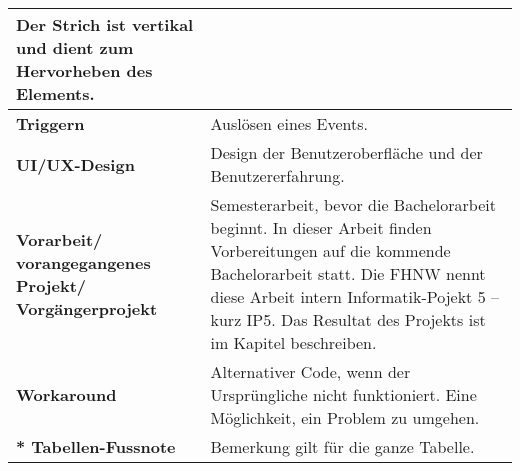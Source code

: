 \begin{table}[!ht]
\begin{adjustbox}{max width=\textwidth}
\begin{tabular}{ p{\glossarywithTitle} | p{\glossarywith} }
                Der Strich ist vertikal und dient zum Hervorheben des Elements. \\
            \hline
            \bf{Triggern} & Auslösen eines Events. \\
            \hline
            \bf{UI/UX-Design} & Design der Benutzeroberfläche und der Benutzererfahrung. \\
            \hline
            \raggedright \bf{Vorarbeit/ vorangegangenes Projekt/ Vorgängerprojekt} & 
                Semesterarbeit, bevor die Bachelorarbeit beginnt. 
                In dieser Arbeit finden Vorbereitungen auf die kommende Bachelorarbeit statt. 
                Die FHNW nennt diese Arbeit intern Informatik-Pojekt 5 – kurz IP5. 
                Das Resultat des Projekts ist im Kapitel \nameref{sec:countryChoice} beschreiben. \\
            \hline
            \bf{Workaround} & 
                Alternativer Code, wenn der Ursprüngliche nicht funktioniert. 
                Eine Möglichkeit, ein Problem zu umgehen. \\
            \hline
            \hline
            \raggedright \bf{* Tabellen-Fussnote} & Bemerkung gilt für die ganze Tabelle. \\
            \hline
        \end{tabular}
    \end{adjustbox}
\end{table}
